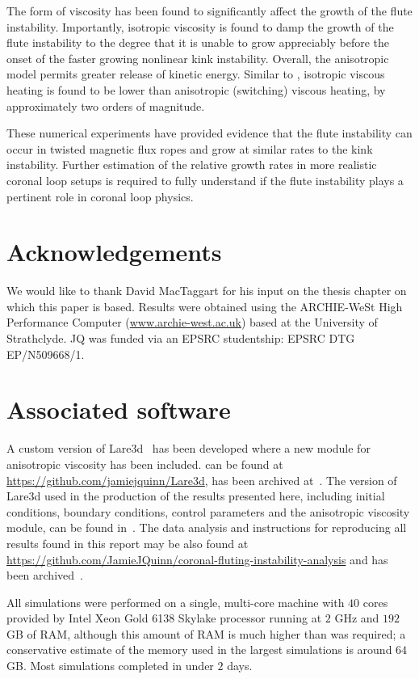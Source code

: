 \documentclass[fleqn,usenatbib]{mnras}
\newcommand{\rs}[2]{{#2}}
\begin{document}
The form of viscosity has been found to significantly affect the
growth of the flute instability. Importantly, isotropic
viscosity is found to damp the growth of the flute
instability to the degree that it is unable to grow appreciably before
the onset of the faster growing nonlinear kink instability. Overall,
the \rs{switching}{anisotropic} model permits greater release of
kinetic energy. Similar to \rs{chapter}{}
\citep{quinnEffectAnisotropicViscosity2020}, isotropic viscous heating
is found to be \rs{significantly lower}{lower} than anisotropic (switching)
viscous heating, by approximately two orders of magnitude. 

These numerical experiments have provided evidence that the flute instability can occur in twisted magnetic flux ropes and grow at similar rates to the kink instability. Further estimation of the relative growth rates in more realistic coronal loop setups is required to fully understand if the flute instability plays a pertinent role in coronal loop physics.

\section*{Acknowledgements}

We would like to thank David MacTaggart for his input on the thesis chapter on which this paper is based. Results were obtained using the ARCHIE-WeSt High Performance Computer
(\url{www.archie-west.ac.uk}) based at the University of
Strathclyde. JQ was funded via an EPSRC studentship: EPSRC DTG EP/N509668/1.




\appendix

\section{Associated software}

A custom version of Lare3d~\citep{arberStaggeredGridLagrangian2001} has been developed where a new module for anisotropic viscosity has been included. \rs{The version including the new module}{} can be found at \url{https://github.com/jamiejquinn/Lare3d}, \rs{and also}{has been} archived at~\citep{keith_bennett_2020_4155546}. The version of Lare3d used in the production of the results presented here, including initial conditions, boundary conditions, control parameters and the anisotropic viscosity module, can be found in~\citet{keith_bennett_2020_4155625}. The data analysis and instructions for reproducing all results found in this report may be also found at \url{https://github.com/JamieJQuinn/coronal-fluting-instability-analysis} and has been archived~\citep{quinnJamieJQuinnCoronalflutinginstabilityanalysis2021}.

All simulations were performed on a single, multi-core machine with $40$ cores provided by Intel Xeon Gold 6138 Skylake processor running at $2$ GHz and $192$ GB of RAM, although this amount of RAM is much higher than was required; a conservative estimate of the memory used in the largest simulations is around $64$ GB. Most simulations completed in under $2$ days.

\bsp	%
\label{lastpage}
\end{document}
